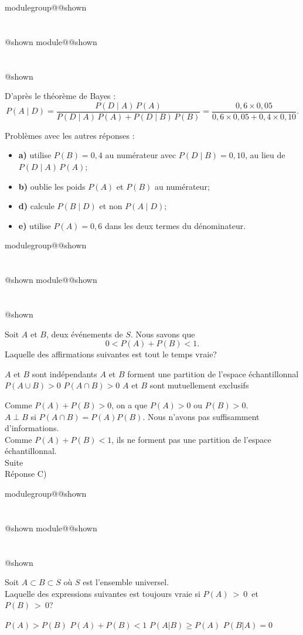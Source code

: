 \documentclass{Evaluation}
\makeatletter
\newcommand{\currentmodulekey}{}
\newcommand{\currentmoduletitle}{}
\newcommand{\currentgroupkey}{}
\newcommand{\currentgrouptitle}{}
\newcommand{\showmoduleifneeded}{%
  \ifx\currentgroupkey\empty\else
    \expandafter\ifx\csname modulegroup@\currentgroupkey @shown\endcsname\relax
      \section*{\currentgrouptitle}%
      \expandafter\gdef\csname modulegroup@\currentgroupkey @shown\endcsname{1}%
    \fi
  \fi
  \expandafter\ifx\csname module@\currentmodulekey @shown\endcsname\relax
    \section*{\currentmoduletitle}%
    \expandafter\gdef\csname module@\currentmodulekey @shown\endcsname{1}%
  \fi
}
\newenvironment{A22}{\showmoduleifneeded}{}
\newenvironment{H26r}{\showmoduleifneeded}{}
\makeatother
\begin{document}
\begin{questions}
\begin{H26r}
\begin{solution}
D'après le théorème de Bayes :
$$P(A\mid D)=\frac{P(D\mid A)\,P(A)}{P(D\mid A)\,P(A)+P(D\mid B)\,P(B)}=\frac{0{,}6\times 0{,}05}{0{,}6\times 0{,}05+0{,}4\times 0{,}10}.$$

Problèmes avec les autres réponses :
\begin{itemize}
\item \textbf{a)} utilise $P(B)=0{,}4$ au numérateur avec $P(D\mid B)=0{,}10$, au lieu de $P(D\mid A)\,P(A)$;
\item \textbf{b)} oublie les poids $P(A)$ et $P(B)$ au numérateur;
\item \textbf{d)} calcule $P(B\mid D)$ et non $P(A\mid D)$;
\item \textbf{e)} utilise $P(A)=0{,}6$ dans les deux termes du dénominateur.
\end{itemize}
\end{solution}
\end{H26r}

\begin{A22}
\question {} %
Soit $A$ et $B$, deux événements de $S$. Nous savons que $$0<P(A)+P(B)<1.$$ Laquelle des affirmations suivantes est tout le temps vraie?

\begin{checkboxes}
    \choice $A$ et $B$ sont indépendants
    \choice $A$ et $B$ forment une partition de l'espace échantillonnal
    \correctchoice $P(A \cup B) > 0$
    \choice $P(A \cap B) > 0$
    \choice $A$ et $B$ sont mutuellement exclusifs
\end{checkboxes}

\begin{solution}
Comme $P(A)+P(B)>0$, on a que $P(A)>0$ ou $P(B)>0$.\\ 
$A \perp B$ si $P(A\cap B)=P(A)P(B)$. Nous n'avons pas suffisamment d'informations.\\
Comme $P(A)+P(B)<1$, ils ne forment pas une partition de l'espace échantillonnal.\\
Suite\\
Réponse C)
\end{solution}
\end{A22}

\begin{A22}
\question {} %
Soit $A\subset B \subset S$ où $S$ est l'ensemble universel.\\
Laquelle des expressions suivantes est toujours vraie si $P(A)~>~0$~et~$P(B)~>~0$?

\begin{oneparcheckboxes}
    \choice $P(A) > P(B)$
    \choice $P(A)+P(B)<1$
    \correctchoice $P(A|B)\geq P(A)$
    \choice $P(B|A)=0$
\end{oneparcheckboxes}
\end{A22}


\end{questions}
\end{document}
